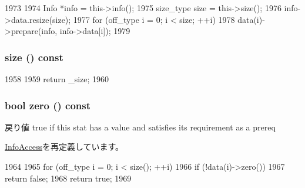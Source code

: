 \begin{DoxyCode}
1973     {
1974         Info *info = this->info();
1975         size_type size = this->size();
1976         info->data.resize(size);
1977         for (off_type i = 0; i < size; ++i)
1978             data(i)->prepare(info, info->data[i]);
1979     }
\end{DoxyCode}
\hypertarget{classStats_1_1VectorDistBase_a503ab01f6c0142145d3434f6924714e7}{
\subsubsection[{size}]{ size () const}}
\label{classStats_1_1VectorDistBase_a503ab01f6c0142145d3434f6924714e7}



\begin{DoxyCode}
1958     {
1959         return _size;
1960     }
\end{DoxyCode}
\hypertarget{classStats_1_1VectorDistBase_a4e72b01b727d3165e75cba84eb507491}{
\subsubsection[{zero}]{\setlength{\rightskip}{0pt plus 5cm}bool zero () const}}
\label{classStats_1_1VectorDistBase_a4e72b01b727d3165e75cba84eb507491}
\begin{DoxyReturn}{戻り値}
true if this stat has a value and satisfies its requirement as a prereq 
\end{DoxyReturn}


\hyperlink{classStats_1_1InfoAccess_a4e72b01b727d3165e75cba84eb507491}{InfoAccess}を再定義しています。


\begin{DoxyCode}
1964     {
1965         for (off_type i = 0; i < size(); ++i)
1966             if (!data(i)->zero())
1967                 return false;
1968         return true;
1969     }
\end{DoxyCode}


